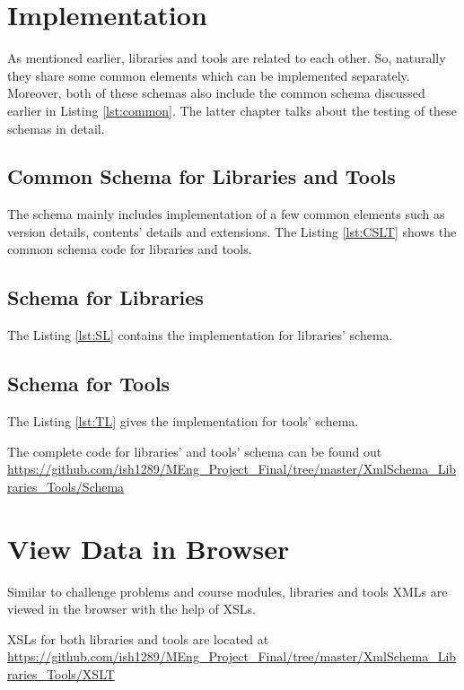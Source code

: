 \documentclass[11pt,letterpaper]{report}
\begin{document}
  
\section{Implementation}
As mentioned earlier, libraries and tools are related to each other. So, naturally they share some common elements which can be implemented separately. Moreover, both of these schemas also include the common schema discussed earlier in Listing \ref{lst:common}. The latter chapter talks about the testing of these schemas in detail. 
\subsection{Common Schema for Libraries and Tools}
The schema mainly includes implementation of a few common elements such as version details, contents' details and extensions. The Listing \ref{lst:CSLT} shows the common schema code for libraries and tools.
  
\subsection{Schema for Libraries}
The Listing \ref{lst:SL} contains the implementation for libraries' schema. 

\subsection{Schema for Tools}
The Listing \ref{lst:TL} gives the implementation for tools' schema. 


\bigskip
The complete code for libraries' and tools' schema can be found out \url{https://github.com/ish1289/MEng_Project_Final/tree/master/XmlSchema_Libraries_Tools/Schema}
\section{View Data in Browser}
Similar to challenge problems and course modules, libraries and tools XMLs are viewed in the browser with the help of XSLs. 

XSLs for both libraries and tools are located at 
\url{https://github.com/ish1289/MEng_Project_Final/tree/master/XmlSchema_Libraries_Tools/XSLT}
\end{document}

